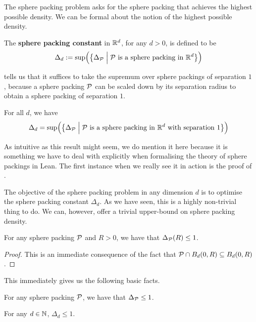 The sphere packing problem asks for the sphere packing that achieves the highest possible density. We can be formal about the notion of the highest possible density.

\begin{boxdefinition}
    The \textbf{sphere packing constant} in $\mathbb{R}^d$, for any $d > 0$, is defined to be
    \begin{align*}
        \Delta_d := \sup\!\left( {\left\{ \Delta_{\mathcal{P}} \; \middle\vert \; \mathcal{P} \text{ is a sphere packing in } \mathbb{R}^d \right\}} \right)
    \end{align*}
\end{boxdefinition}

 tells us that it suffices to take the supremum over sphere packings of separation $1$, because a sphere packing $\mathcal{P}$ can be scaled down by its separation radius to obtain a sphere packing of separation $1$.

\begin{boxproposition}
    For all $d$, we have
    \begin{align*}
        \Delta_d = \sup\!\left( {\left\{ \Delta_{\mathcal{P}} \; \middle\vert \; \mathcal{P} \text{ is a sphere packing in } \mathbb{R}^d \text{ with separation } 1 \right\}} \right)
    \end{align*}
\end{boxproposition}

As intuitive as this result might seem, we do mention it here because it is something we have to deal with explicitly when formalising the theory of sphere packings in Lean. The first instance when we really see it in action is the proof of .

The objective of the sphere packing problem in any dimension $d$ is to optimise the sphere packing constant $\Delta_d$. As we have seen, this is a highly non-trivial thing to do. We can, however, offer a trivial upper-bound on sphere packing density.

\begin{boxlemma}
    For any sphere packing $\mathcal{P}$ and $R > 0$, we have that $\Delta_{\mathcal{P}}(R) \leq 1$.
\end{boxlemma}
\begin{proof}
    This is an immediate consequence of the fact that $\mathcal{P} \cap B_d(0, R) \subseteq B_d(0, R)$.
\end{proof}
This immediately gives us the following basic facts.
\begin{boxcorollary}
    For any sphere packing $\mathcal{P}$, we have that $\Delta_{\mathcal{P}} \leq 1$.
\end{boxcorollary}
\begin{boxcorollary}
    For any $d \in \mathbb{N}$, $\Delta_d \leq 1$.
\end{boxcorollary}

